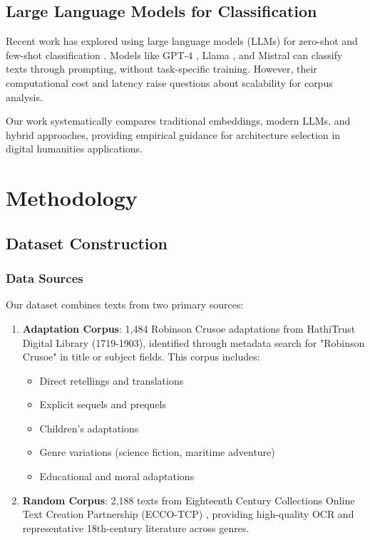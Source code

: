 \documentclass[12pt,a4paper]{article}
\begin{document}
\subsection{Large Language Models for Classification}

Recent work has explored using large language models (LLMs) for zero-shot and few-shot classification \cite{Brown2020}. Models like GPT-4 \cite{OpenAI2023}, Llama \cite{Touvron2023}, and Mistral \cite{Jiang2023} can classify texts through prompting, without task-specific training. However, their computational cost and latency raise questions about scalability for corpus analysis.

Our work systematically compares traditional embeddings, modern LLMs, and hybrid approaches, providing empirical guidance for architecture selection in digital humanities applications.

\section{Methodology}

\subsection{Dataset Construction}

\subsubsection{Data Sources}

Our dataset combines texts from two primary sources:

\begin{enumerate}
    \item \textbf{Adaptation Corpus}: 1,484 Robinson Crusoe adaptations from HathiTrust Digital Library (1719-1903), identified through metadata search for "Robinson Crusoe" in title or subject fields. This corpus includes:
    \begin{itemize}
        \item Direct retellings and translations
        \item Explicit sequels and prequels
        \item Children's adaptations
        \item Genre variations (science fiction, maritime adventure)
        \item Educational and moral adaptations
    \end{itemize}

    \item \textbf{Random Corpus}: 2,188 texts from Eighteenth Century Collections Online Text Creation Partnership (ECCO-TCP) \cite{Welzenbach2011}, providing high-quality OCR and representative 18th-century literature across genres.
\end{enumerate}
\end{document}
